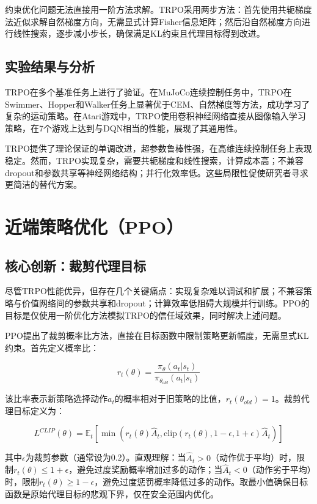 \documentclass[12pt,a4paper]{article}
\begin{document}
约束优化问题无法直接用一阶方法求解。TRPO采用两步方法：首先使用共轭梯度法近似求解自然梯度方向，无需显式计算Fisher信息矩阵；然后沿自然梯度方向进行线性搜索，逐步减小步长，确保满足KL约束且代理目标得到改进。

\subsection{实验结果与分析}

TRPO在多个基准任务上进行了验证。在MuJoCo连续控制任务中，TRPO在Swimmer、Hopper和Walker任务上显著优于CEM、自然梯度等方法，成功学习了复杂的运动策略。在Atari游戏中，TRPO使用卷积神经网络直接从图像输入学习策略，在7个游戏上达到与DQN相当的性能，展现了其通用性。

TRPO提供了理论保证的单调改进，超参数鲁棒性强，在高维连续控制任务上表现稳定。然而，TRPO实现复杂，需要共轭梯度和线性搜索，计算成本高；不兼容dropout和参数共享等神经网络结构；并行化效率低。这些局限性促使研究者寻求更简洁的替代方案。

\section{近端策略优化（PPO）}

\subsection{核心创新：裁剪代理目标}

尽管TRPO性能优异，但存在几个关键痛点：实现复杂难以调试和扩展；不兼容策略与价值网络间的参数共享和dropout；计算效率低阻碍大规模并行训练。PPO的目标是仅使用一阶优化方法模拟TRPO的信任域效果，同时解决上述问题。

PPO提出了裁剪概率比方法，直接在目标函数中限制策略更新幅度，无需显式KL约束。首先定义概率比：

\begin{equation}
r_t(\theta) = \frac{\pi_{\theta}(a_t|s_t)}{\pi_{\theta_{old}}(a_t|s_t)}
\end{equation}

该比率表示新策略选择动作$a_t$的概率相对于旧策略的比值，$r_t(\theta_{old})=1$。裁剪代理目标定义为：

\begin{equation}
L^{CLIP}(\theta) = \mathbb{E}_t\left[\min\left(r_t(\theta)\hat{A}_t, \text{clip}(r_t(\theta), 1-\epsilon, 1+\epsilon)\hat{A}_t\right)\right]
\end{equation}

其中$\epsilon$为裁剪参数（通常设为0.2）。直观理解：当$\hat{A}_t>0$（动作优于平均）时，限制$r_t(\theta)\leq1+\epsilon$，避免过度奖励概率增加过多的动作；当$\hat{A}_t<0$（动作劣于平均）时，限制$r_t(\theta)\geq1-\epsilon$，避免过度惩罚概率降低过多的动作。取最小值确保目标函数是原始代理目标的悲观下界，仅在安全范围内优化。
\end{document}
